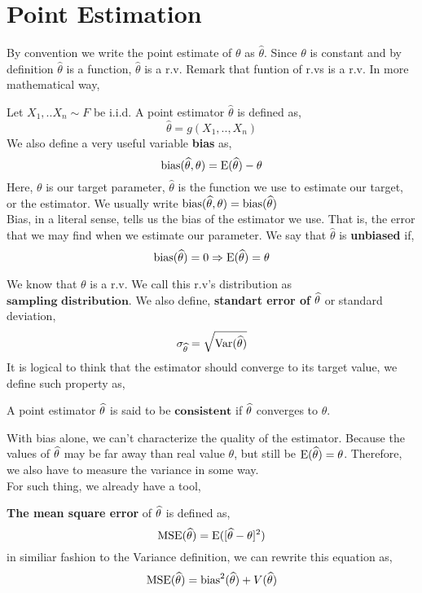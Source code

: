 \section{Point Estimation}
By convention we write the point estimate of $\theta$ as $\widehat{\theta}$. Since $\theta$ is constant and by definition $\widehat{\theta}$ is a function, $\widehat{\theta}$ is a r.v. Remark that funtion of r.vs is a r.v. In more mathematical way,
\begin{definition}
    Let $X_1,..X_n \sim F$ be i.i.d. A point estimator $\widehat{\theta}$ is defined as,
    \[\widehat{\theta} = g(X_1,..,X_n)\]
    We also define a very useful variable \textbf{bias} as,
    \[\operatorname{bias}(\widehat{\theta}, \theta) = \operatorname{E}(\widehat{\theta}) - \theta\]
    Here, $\theta$ is our target parameter, $\widehat{\theta}$ is the function we use to estimate our target, or the estimator. We usually write $\operatorname{bias}(\widehat{\theta},\theta) = \operatorname{bias}(\widehat{\theta})$ 
    \\
    Bias, in a literal sense, tells us the bias of the estimator we use. That is, the error that we may find when we estimate our parameter. We say that $\widehat{\theta}$ is \textbf{unbiased} if,
    \[\operatorname{bias} (\widehat{\theta}) = 0 \Rightarrow {\operatorname{E}}(\widehat{\theta}) = \theta \]
\end{definition}
We know that $\theta$ is a r.v. We call this r.v's distribution as $\textbf{sampling distribution}$. We also define,
\textbf{standart error of} ${\widehat{\theta}}$ or standard deviation,
\[\sigma_{{\widehat{\theta}}}= \sqrt{{\operatorname{Var}}({\widehat{\theta}})}\]
It is logical to think that the estimator should converge to its target value, we define such property as,
\begin{definition}
    A point estimator ${\widehat{\theta}}$ is said to be $\textbf{consistent}$ if  ${\widehat{\theta}}$ converges to $\theta$.
\end{definition}

\par
With bias alone, we can't characterize the quality of the estimator. Because the values of ${\widehat{\theta}}$ may be far away than real value $\theta$, but still be ${\operatorname{E}}({\widehat{\theta}}) = \theta$. Therefore, we also have to measure the variance in some way.
\\
For such thing, we already have a tool,
\begin{definition}
    \textbf{The mean square error} of ${\widehat{\theta}}$ is defined as,
    \[\operatorname{MSE}({\widehat{\theta}}) = {\operatorname{E}}([{\widehat{\theta}} - \theta]^2)\]
    in similiar fashion to the Variance definition, we can rewrite this equation as,
    \[\operatorname{MSE}({\widehat{\theta}}) =\operatorname{bias}^2({\widehat{\theta}}) + V({\widehat{\theta}})\]
\end{definition}







